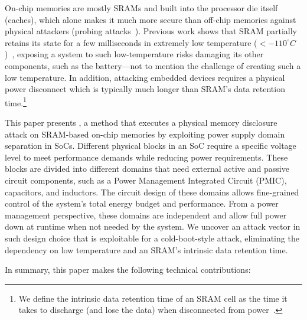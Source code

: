 On-chip memories are mostly SRAMs and built into the processor die itself (\eg caches), which alone makes it much more secure than off-chip memories against physical attackers (\eg probing attacks~\cite{zhang2016case, henson2013beyond}). 
Previous work shows that SRAM partially retains its state for a few milliseconds in extremely low temperature ($<-110^\circ C$)~\cite{anagnostopoulos2018low}, exposing a system to such low-temperature risks damaging its other components, such as the battery---not to mention the challenge of creating such a low temperature. 
In addition, attacking embedded devices requires a physical power disconnect which is typically much longer than SRAM's data retention time.\footnote{We define the intrinsic data retention time of an SRAM cell as the time it takes to discharge (and lose the data) when disconnected from power~\cite{rahmati2012tardis}.}

This paper presents \sys{}, a method that executes a physical memory disclosure attack on SRAM-based on-chip memories by exploiting power supply domain separation in SoCs. 
Different physical blocks in an SoC require a specific voltage level to meet performance demands while reducing power requirements.
These blocks are divided into different domains that need external active and passive circuit components, such as a Power Management Integrated Circuit (PMIC), capacitors, and inductors. 
The circuit design of these domains allows fine-grained control of the system's total energy budget and performance. 
From a power management perspective, these domains are independent and allow full power down at runtime when not needed by the system.
We uncover an attack vector in such design choice that is exploitable for a cold-boot-style attack, eliminating the dependency on low temperature and an SRAM's intrinsic data retention time.  




In summary, this paper makes the following technical contributions:

